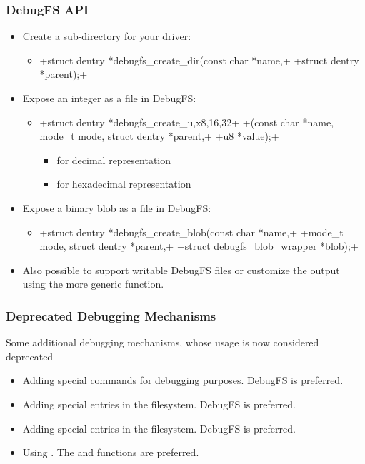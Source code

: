 \begin{frame}[fragile]
  \frametitle{DebugFS API}
  \begin{itemize}
  \item Create a sub-directory for your driver:
    \begin{itemize}
    \item {}+struct dentry *debugfs_create_dir(const char *name,+
      +struct dentry *parent);+
    \end{itemize}
  \item Expose an integer as a file in DebugFS:
    \begin{itemize}
    \item {}+struct dentry *debugfs_create_{u,x}{8,16,32}+
      +(const char *name, mode_t mode, struct dentry *parent,+
      +u8 *value);+
      \begin{itemize}
      \item {} for decimal representation
      \item {} for hexadecimal representation
      \end{itemize}
    \end{itemize}
  \item Expose a binary blob as a file in DebugFS:
    \begin{itemize}
    \item {}+struct dentry *debugfs_create_blob(const char *name,+
      +mode_t mode, struct dentry *parent,+
      +struct debugfs_blob_wrapper *blob);+
    \end{itemize}
  \item Also possible to support writable DebugFS files or customize
    the output using the more generic 
    function.
  \end{itemize}
\end{frame}

\begin{frame}
  \frametitle{Deprecated Debugging Mechanisms}
  Some additional debugging mechanisms, whose usage is now
  considered deprecated
  \begin{itemize}
  \item Adding special  commands for debugging
    purposes. DebugFS is preferred.
  \item Adding special entries in the  filesystem. DebugFS is
    preferred.
  \item Adding special entries in the  filesystem. DebugFS is
    preferred.
  \item Using . The  and 
    functions are preferred.
  \end{itemize}
\end{frame}

